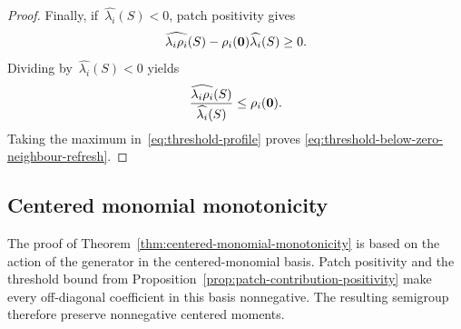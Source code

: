 \documentclass[EJP,preprint,NODS,nobera]{ejpecp}
\begin{document}
\begin{proof}
Finally, if~$\widehat{\lambda_i}(S)<0$, patch positivity gives
\begin{equation*}
\widehat{\lambda_i\rho_i}(S)
-
\rho_i(\mathbf{0})\widehat{\lambda_i}(S)
\geq0.
\end{equation*}
Dividing by~$\widehat{\lambda_i}(S)<0$ yields
\begin{equation*}
\frac{\widehat{\lambda_i\rho_i}(S)}
{\widehat{\lambda_i}(S)}
\leq
\rho_i(\mathbf{0}).
\end{equation*}
Taking the maximum in~\eqref{eq:threshold-profile} proves
\eqref{eq:threshold-below-zero-neighbour-refresh}.
\end{proof}

\subsection{Centered monomial monotonicity}
\label{subsec:proof-centered-monomial-monotonicity}

The proof of Theorem~\ref{thm:centered-monomial-monotonicity} is based on the
action of the generator in the centered-monomial basis. Patch positivity and
the threshold bound from Proposition~\ref{prop:patch-contribution-positivity}
make every off-diagonal coefficient in this basis nonnegative. The resulting semigroup therefore preserve nonnegative centered moments.
\end{document}
